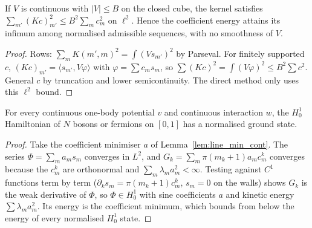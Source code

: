 \begin{lemma}
  \label{lem:line_min_cont}
  \leanok
  If $V$ is continuous with $|V|\le B$ on the closed cube, the kernel satisfies $\sum_{m'}(Kc)_{m'}^2\le
  B^2\sum_m c_m^2$ on $\ell^2$. Hence the coefficient energy attains its infimum among normalised admissible
  sequences, with no smoothness of $V$.
\end{lemma}
\begin{proof}
  \leanok
  Rows: $\sum_m K(m',m)^2=\int(Vs_{m'})^2$ by Parseval. For finitely supported $c$, $(Kc)_{m'}=\langle
  s_{m'},V\varphi\rangle$ with $\varphi=\sum c_ms_m$, so $\sum(Kc)^2=\int(V\varphi)^2\le B^2\sum c^2$. General
  $c$ by truncation and lower semicontinuity. The direct method only uses this $\ell^2$ bound.
\end{proof}

\begin{theorem}
  \label{thm:line_gs_cont}
  \leanok
  For every continuous one-body potential $v$ and continuous interaction $w$, the $H^1_0$ Hamiltonian of $N$
  bosons or fermions on $[0,1]$ has a normalised ground state.
\end{theorem}
\begin{proof}
  \leanok
  Take the coefficient minimiser $a$ of Lemma~\ref{lem:line_min_cont}. The series $\Phi=\sum_ma_ms_m$ converges in
  $L^2$, and $G_k=\sum_m\pi(m_k+1)a_mc^k_m$ converges because the $c^k_m$ are orthonormal and
  $\sum_m\lambda_ma_m^2<\infty$. Testing against $C^1$ functions term by term ($\partial_ks_m=\pi(m_k+1)c^k_m$, $s_m=0$ on
  the walls) shows $G_k$ is the weak derivative of $\Phi$, so $\Phi\in H^1_0$ with sine coefficients $a$ and kinetic
  energy $\sum\lambda_ma_m^2$. Its energy is the coefficient minimum, which bounds from below the energy of every
  normalised $H^1_0$ state.
\end{proof}

